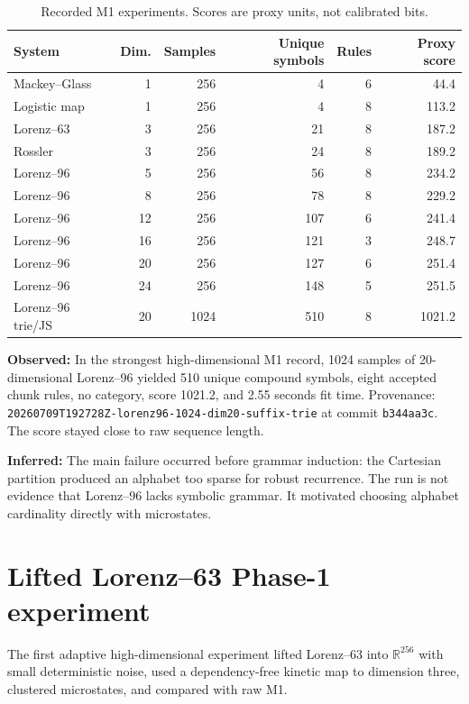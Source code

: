 \documentclass[11pt]{article}
\newcommand{\observed}{\textbf{Observed:}}
\newcommand{\inferred}{\textbf{Inferred:}}
\begin{document}
\begin{table}[ht]
\centering\small
\begin{tabular}{lrrrrr}
\toprule
System & Dim. & Samples & Unique symbols & Rules & Proxy score \\
\midrule
Mackey--Glass & 1 & 256 & 4 & 6 & 44.4 \\
Logistic map & 1 & 256 & 4 & 8 & 113.2 \\
Lorenz--63 & 3 & 256 & 21 & 8 & 187.2 \\
Rossler & 3 & 256 & 24 & 8 & 189.2 \\
Lorenz--96 & 5 & 256 & 56 & 8 & 234.2 \\
Lorenz--96 & 8 & 256 & 78 & 8 & 229.2 \\
Lorenz--96 & 12 & 256 & 107 & 6 & 241.4 \\
Lorenz--96 & 16 & 256 & 121 & 3 & 248.7 \\
Lorenz--96 & 20 & 256 & 127 & 6 & 251.4 \\
Lorenz--96 & 24 & 256 & 148 & 5 & 251.5 \\
Lorenz--96 trie/JS & 20 & 1024 & 510 & 8 & 1021.2 \\
\bottomrule
\end{tabular}
\caption{Recorded M1 experiments. Scores are proxy units, not calibrated bits.}
\label{tab:m1}
\end{table}

\observed{} In the strongest high-dimensional M1 record, 1024 samples of
20-dimensional Lorenz--96 yielded 510 unique compound symbols, eight accepted
chunk rules, no category, score 1021.2, and 2.55 seconds fit time. Provenance:
\texttt{20260709T192728Z-lorenz96-1024-dim20-suffix-trie} at commit
\texttt{b344aa3c}. The score stayed close to raw sequence length.

\inferred{} The main failure occurred before grammar induction: the Cartesian
partition produced an alphabet too sparse for robust recurrence. The run is not
evidence that Lorenz--96 lacks symbolic grammar. It motivated choosing alphabet
cardinality directly with microstates.

\section{Lifted Lorenz--63 Phase-1 experiment}

The first adaptive high-dimensional experiment lifted Lorenz--63 into
$\mathbb{R}^{256}$ with small deterministic noise, used a dependency-free
kinetic map to dimension three, clustered microstates, and compared with raw M1.
\end{document}
